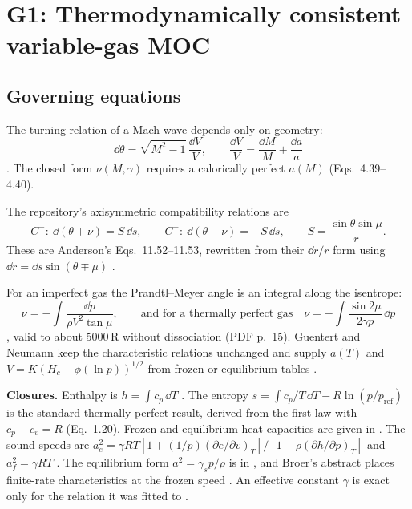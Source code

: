 \section[G1: Variable-gas MOC]{G1: Thermodynamically consistent variable-gas MOC}
\label{sec:g1}
\subsection{Governing equations}
The turning relation of a Mach wave depends only on geometry:
\begin{equation}
\dd\theta=\sqrt{M^2-1}\,\frac{\dd V}{V},\qquad \frac{\dd V}{V}=\frac{\dd M}{M}+\frac{\dd a}{a}
\label{eq:turning}
\end{equation}
\cite[PDF p.~186, printed p.~170, Eqs.~4.35, 4.38]{anderson}. The closed form
$\nu(M,\gamma)$ requires a calorically perfect $a(M)$ (Eqs.~4.39--4.40).

The repository's axisymmetric compatibility relations are
\begin{equation}
C^-:\ \dd(\theta+\nu)=S\,\dd s,\qquad C^+:\ \dd(\theta-\nu)=-S\,\dd s,\qquad S=\frac{\sin\theta\sin\mu}{r}.
\label{eq:compat}
\end{equation}
These are Anderson's Eqs.~11.52--11.53, rewritten from their $\dd r/r$ form using
$\dd r=\dd s\sin(\theta\mp\mu)$ \cite[PDF p.~422, printed p.~406]{anderson}.

For an imperfect gas the Prandtl--Meyer angle is an integral along the isentrope:
\begin{equation}
\nu=-\int\frac{\dd p}{\rho V^2\tan\mu},\qquad
\text{and for a thermally perfect gas}\quad \nu=-\int\frac{\sin 2\mu}{2\gamma p}\,\dd p
\label{eq:nutp}
\end{equation}
\cite[PDF p.~19, printed p.~630, Eqs.~199--200]{ames1953}, valid to about 5000\,R
without dissociation (PDF p.~15). Guentert and Neumann keep the characteristic
relations unchanged and supply $a(T)$ and $V=K(H_c-\phi(\ln p))^{1/2}$ from frozen or
equilibrium tables \cite[PDF pp.~4--7, printed pp.~2--5, Eqs.~1--4, 13--18]{guentert1959}.

\textbf{Closures.} Enthalpy is $h=\int c_p\,\dd T$
\cite[PDF p.~40, printed p.~24, Eq.~1.18]{anderson}. The entropy
$s=\int c_p/T\,\dd T-R\ln(p/p_{\mathrm{ref}})$ is the standard thermally perfect result,
derived from the first law with $c_p-c_v=R$ (Eq.~1.20). Frozen and equilibrium heat
capacities are given in \cite[PDF p.~678, Eqs.~17.20--17.25]{anderson}. The sound speeds
are $a_e^2=\gamma RT[1+(1/p)(\partial e/\partial v)_T]/[1-\rho(\partial h/\partial p)_T]$
and $a_f^2=\gamma RT$ \cite[PDF p.~682, printed p.~666, Eqs.~17.35--17.36]{anderson}. The
equilibrium form $a^2=\gamma_sp/\rho$ is in \cite[PDF p.~5, printed p.~4,
Eqs.~8--10]{moeckel1957}, and Broer's abstract places finite-rate characteristics at the
frozen speed \cite{broer1958}. An effective constant $\gamma$ is exact only for the
relation it was fitted to \cite[PDF pp.~684--685]{anderson}.

